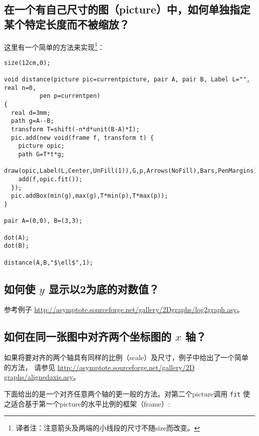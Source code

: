 \subsection{\label{Q6.12}在一个有自己尺寸的图（picture）中，如何单独指定某个特定长度而不被缩放？}
这里有一个简单的方法来实现\footnote{译者注：注意箭头及两端的小线段的尺寸不随size而改变。}：

\begin{lstlisting}
size(12cm,0);
 
void distance(picture pic=currentpicture, pair A, pair B, Label L="", real n=0,
	      pen p=currentpen) 
{
  real d=3mm;
  path g=A--B;
  transform T=shift(-n*d*unit(B-A)*I);
  pic.add(new void(frame f, transform t) {
    picture opic;
    path G=T*t*g;
    draw(opic,Label(L,Center,UnFill(1)),G,p,Arrows(NoFill),Bars,PenMargins);
    add(f,opic.fit());
  });
  pic.addBox(min(g),max(g),T*min(p),T*max(p));
} 
 
pair A=(0,0), B=(3,3);
 
dot(A);
dot(B);
 
distance(A,B,"$\ell$",1);
\end{lstlisting}

\subsection{\label{Q6.13}如何使 $y$ 显示以2为底的对数值？}

参考例子 \url{http://asymptote.sourceforge.net/gallery/2Dgraphs/log2graph.asy}。
\subsection{\label{Q6.14}如何在同一张图中对齐两个坐标图的 $x$ 轴？}
如果将要对齐的两个轴具有同样的比例（scale）及尺寸，例子中给出了一个简单的方法，
请参见 \url{http://asymptote.sourceforge.net/gallery/2D graphs/alignedaxis.asy}。

下面给出的是一个对齐任意两个轴的更一般的方法。对第二个picture调用 \verb|fit|
使之适合基于第一个picture的水平比例的框架（frame）:

